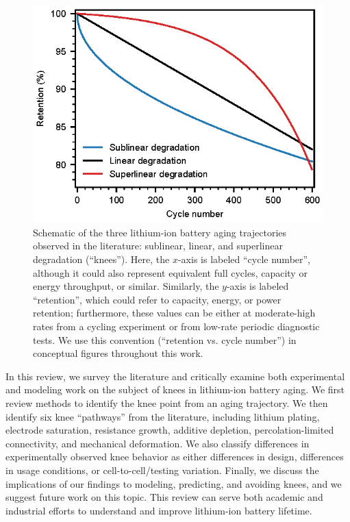 \documentclass[journal=jpclcd,manuscript=article]{achemso}
\begin{document}
\begin{figure}[ht]
\centering
\includegraphics[scale=1]{figures/degradation_rates.eps}
\caption{Schematic of the three lithium-ion battery aging trajectories observed in the literature: sublinear, linear, and superlinear degradation (``knees''). Here, the $x$-axis is labeled ``cycle number'', although it could also represent equivalent full cycles, capacity or energy throughput, or similar. Similarly, the $y$-axis is labeled ``retention'', which could refer to capacity, energy, or power retention; furthermore, these values can be either at moderate-high rates from a cycling experiment or from low-rate periodic diagnostic tests. We use this convention (``retention vs. cycle number'') in conceptual figures throughout this work.}
\label{fig:degradation_shapes}
\end{figure}


In this review, we survey the literature and critically examine both experimental and modeling work on the subject of knees in lithium-ion battery aging. We first review methods to identify the knee point from an aging trajectory. We then identify six knee ``pathways'' from the literature, including lithium plating, electrode saturation, resistance growth, additive depletion, percolation-limited connectivity, and mechanical deformation. We also classify differences in experimentally observed knee behavior as either differences in design, differences in usage conditions, or cell-to-cell/testing variation. Finally, we discuss the implications of our findings to modeling, predicting, and avoiding knees, and we suggest future work on this topic. This review can serve both academic and industrial efforts to understand and improve lithium-ion battery lifetime.
\end{document}

